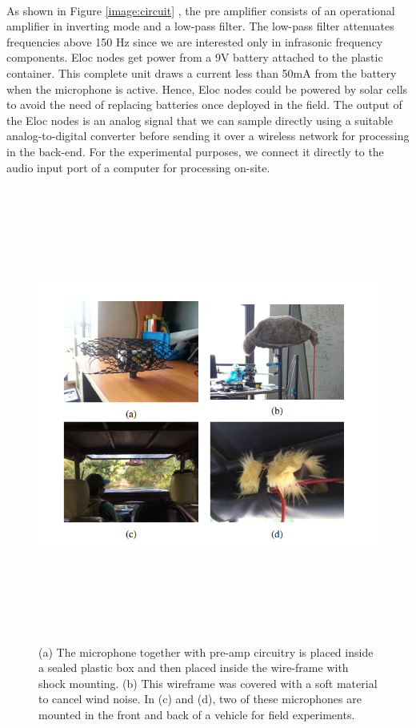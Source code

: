 \documentclass[12pt]{article}
\numberwithin{figure}{section}
\numberwithin{table}{section}
\begin{document}
\paragraph{}
As shown in Figure \ref{image:circuit} , the pre amplifier consists of an operational amplifier in inverting mode and a low-pass filter. The low-pass filter attenuates frequencies above 150 Hz since we are interested only in infrasonic frequency components. Eloc nodes get power from a 9V battery attached to the plastic container. This complete unit draws a current less than 50mA from the battery when the microphone is active. Hence, Eloc nodes could be powered by solar cells to avoid the need of replacing batteries once deployed in the field. The output of the Eloc nodes is an analog signal that we can sample directly using a suitable analog-to-digital converter before sending it over a wireless network for processing in the back-end. For the experimental purposes, we connect it directly to the audio input port of a computer for processing on-site.

\begin{figure}[H]
\centering
\includegraphics[width=12cm,height=15cm,keepaspectratio]{eloc_implementation.png}
\caption{(a) The microphone together with pre-amp circuitry
is placed inside a sealed plastic box and then placed
inside the wire-frame with shock mounting. (b) This wireframe
was covered with a soft material to cancel wind noise.
In (c) and (d), two of these microphones are mounted in the
front and back of a vehicle for field experiments.}
\label{figure:eloc}
\end{figure}
\end{document}
